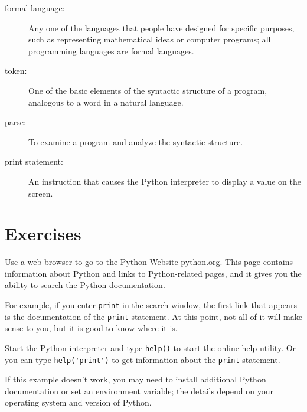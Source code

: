 \documentclass[10pt]{book}
\begin{document}
\begin{description}
\item[formal language:]  Any one of the languages that people have designed
for specific purposes, such as representing mathematical ideas or
computer programs; all programming languages are formal languages.

\item[token:]  One of the basic elements of the syntactic structure of
a program, analogous to a word in a natural language.

\item[parse:]  To examine a program and analyze the syntactic structure.

\item[print statement:]  An instruction that causes the Python
interpreter to display a value on the screen.


\end{description}


\section{Exercises}

\begin{ex}
Use a web browser to go to the Python Website \url{python.org}.
This page contains information about Python and links
to Python-related pages, and it gives you the ability to search
the Python documentation.

For example, if you enter {\tt print} in the search window, the
first link that appears is the documentation of the {\tt print}
statement.  At this point, not all of it will make sense to you,
but it is good to know where it is.

\end{ex}

\begin{ex}
Start the Python interpreter and type {\tt help()} to start the online
help utility.  Or you can type \verb"help('print')" to get information
about the {\tt print} statement.

If this example doesn't work, you
may need to install additional Python documentation or set an
environment variable; the details depend on your operating system and
version of Python.

\end{ex}
\end{document}
